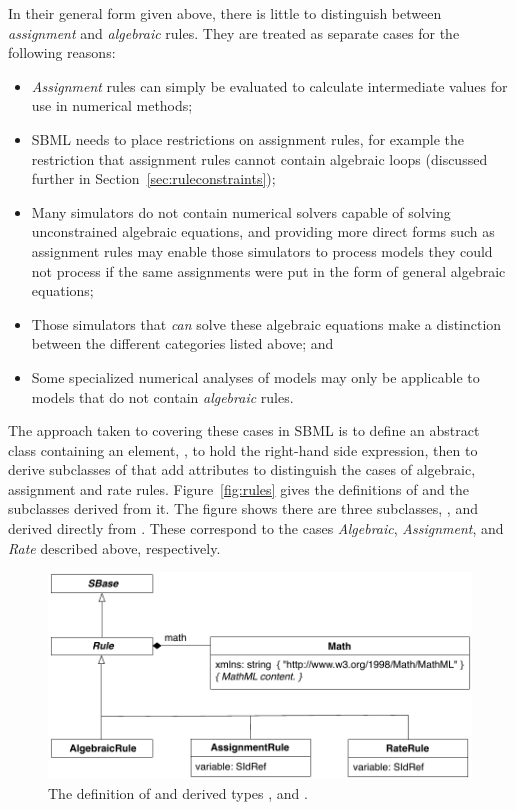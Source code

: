 In their general form given above, there is little to distinguish
between \emph{assignment} and \emph{algebraic} rules.  They are
treated as separate cases for the following reasons:
\begin{itemize}
  
\item \emph{Assignment} rules can simply be evaluated to calculate
  intermediate values for use in numerical methods;
  
\item SBML needs to place restrictions on assignment rules, for
  example the restriction that assignment rules cannot contain
  algebraic loops (discussed further in
  Section~\ref{sec:ruleconstraints});

\item Many simulators do not contain numerical solvers capable of
  solving unconstrained algebraic equations, and providing more
  direct forms such as assignment rules may enable those
  simulators to process models they could not process if the same
  assignments were put in the form of general algebraic equations;
  
\item Those simulators that \emph{can} solve these algebraic
  equations make a distinction between the different categories
  listed above; and
  
\item Some specialized numerical analyses of models may only be
  applicable to models that do not contain \emph{algebraic} rules.

\end{itemize}

The approach taken to covering these cases in SBML is to define an
abstract \Rule class containing an element,
, to hold the right-hand side expression, then to
derive subclasses of \Rule that add attributes to
distinguish the cases of algebraic, assignment and rate rules.
Figure~\vref{fig:rules} gives the definitions of \Rule and the
subclasses derived from it.  The figure shows there are three
subclasses, \AlgebraicRule, \AssignmentRule and \RateRule derived
directly from \Rule. These correspond to the cases
\emph{Algebraic}, \emph{Assignment}, and \emph{Rate} described
above, respectively.

\begin{figure}[htb]
  \centering
  \includegraphics[scale=0.8]{figs/rule-uml}
  \caption{The definition of \RuleUpright and derived types
      \AlgebraicRule, \AssignmentRule and \RateRule.}
  \label{fig:rules}
\end{figure}



